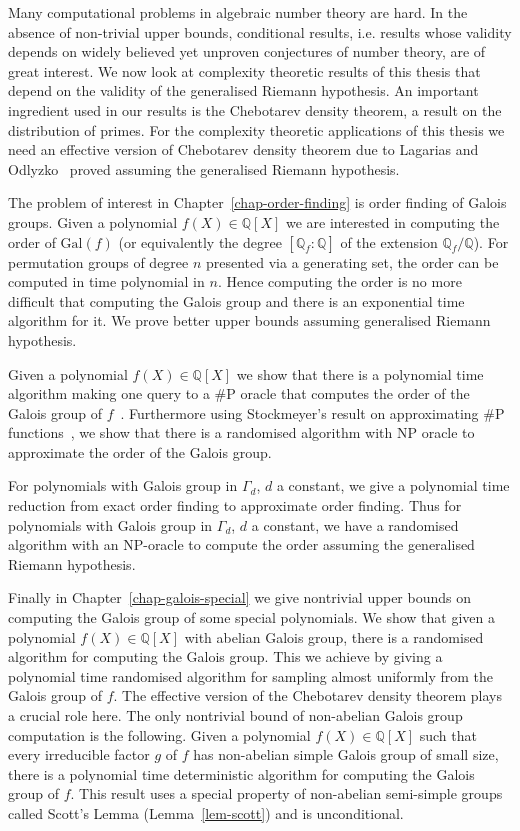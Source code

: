\documentclass[11pt]{madras}%
\theoremstyle{remark}
\newcommand{\Gal}[1]{{\ensuremath{\mathrm{Gal}\left(#1\right)}}}
\begin{document}
Many computational problems in algebraic number theory are hard. In
the absence of non-trivial upper bounds, conditional results, i.e.
results whose validity depends on widely believed yet unproven
conjectures of number theory, are of great interest. We now look at
complexity theoretic results of this thesis that depend on the
validity of the generalised Riemann hypothesis. An important
ingredient used in our results is the Chebotarev density theorem, a
result on the distribution of primes. For the complexity theoretic
applications of this thesis we need an effective version of Chebotarev
density theorem due to Lagarias and
Odlyzko~\cite{lagarias:1977:effective} proved assuming the generalised
Riemann hypothesis.

The problem of interest in Chapter~\ref{chap-order-finding} is order
finding of Galois groups. Given a polynomial $f(X) \in \mathbb{Q}[X]$
we are interested in computing the order of $\Gal{f}$ (or equivalently
the degree $[\mathbb{Q}_f:\mathbb{Q}]$ of the extension
$\mathbb{Q}_f/\mathbb{Q}$). For permutation groups of degree $n$
presented via a generating set, the order can be computed in time
polynomial in $n$. Hence computing the order is no more difficult that
computing the Galois group and there is an exponential time algorithm
for it. We prove better upper bounds assuming generalised Riemann
hypothesis.

Given a polynomial $f(X) \in \mathbb{Q}[X]$ we show that there is a
polynomial time algorithm making one query to a $\# \mathrm{P}$ oracle
that computes the order of the Galois group of
$f$~\cite{arvind2003galois}. Furthermore using Stockmeyer's result on
approximating $\# \mathrm{P}$
functions~\cite{stockmeyer85approximating}, we show that there is a
randomised algorithm with $\mathrm{NP}$ oracle to approximate the
order of the Galois group.

For polynomials with Galois group in $\Gamma_d$, $d$ a constant, we
give a polynomial time reduction from exact order finding to
approximate order finding. Thus for polynomials with Galois group in
$\Gamma_d$, $d$ a constant, we have a randomised algorithm with an
$\mathrm{NP}$-oracle to compute the order assuming the generalised
Riemann hypothesis.

Finally in Chapter~\ref{chap-galois-special} we give nontrivial upper
bounds on computing the Galois group of some special polynomials.  We
show that given a polynomial $f(X) \in \mathbb{Q}[X]$ with abelian
Galois group, there is a randomised algorithm for computing the Galois
group. This we achieve by giving a polynomial time randomised
algorithm for sampling almost uniformly {from} the Galois group of
$f$.  The effective version of the Chebotarev density theorem plays a
crucial role here. The only nontrivial bound of non-abelian Galois
group computation is the following. Given a polynomial $f(X) \in
\mathbb{Q}[X]$ such that every irreducible factor $g$ of $f$ has
non-abelian simple Galois group of small size, there is a polynomial
time deterministic algorithm for computing the Galois group of $f$.
This result uses a special property of non-abelian semi-simple groups
called Scott's Lemma (Lemma~\ref{lem-scott}) and is unconditional.
\end{document}
